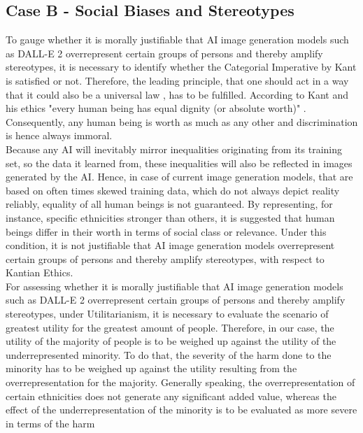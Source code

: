 \documentclass[10pt,twocolumn,twoside]{osajnl}
\begin{document}
\subsection{Case B - Social Biases and Stereotypes}
\label{socialbias}
To gauge whether it is morally justifiable that AI image generation models such as DALL-E 2 overrepresent certain groups of persons and thereby amplify stereotypes, it is necessary to 
identify whether the Categorial Imperative by Kant is satisfied or not. Therefore, the leading principle, that one should act in a way that it could also be a universal law \cite{kant}, has to be fulfilled. 
According to Kant and his ethics "every human being has equal dignity (or absolute worth)" \cite{kant}. Consequently, any human being is worth as much as any other and discrimination is hence always immoral. 
\\
Because any AI will inevitably mirror inequalities originating from its training set, so the data it learned from, these inequalities will also be reflected in images generated by the AI. 
Hence, in case of current image generation models, that are based on often times skewed training data, which do not always depict reality reliably, equality of all human beings is not guaranteed.
By representing, for instance, specific ethnicities stronger than others, it is suggested that human beings differ in their worth in terms of social class or relevance. 
Under this condition, it is not justifiable that AI image generation models overrepresent certain groups of persons and thereby amplify stereotypes, with respect to Kantian Ethics.
\\
For assessing whether it is morally justifiable that AI image generation models such as DALL-E 2 overrepresent certain groups of persons and thereby amplify stereotypes, under Utilitarianism,
it is necessary to evaluate the scenario of greatest utility for the greatest amount of people. Therefore, in our case, the utility of the majority of people is to be weighed up against the utility of the underrepresented 
minority. To do that, the severity of the harm done to the minority has to be weighed up against the utility resulting from the overrepresentation for the majority. Generally speaking, 
the overrepresentation of certain ethnicities does not generate any significant added value, whereas the effect of the underrepresentation of the minority is to be evaluated as more severe in terms of the harm 
\end{document}
